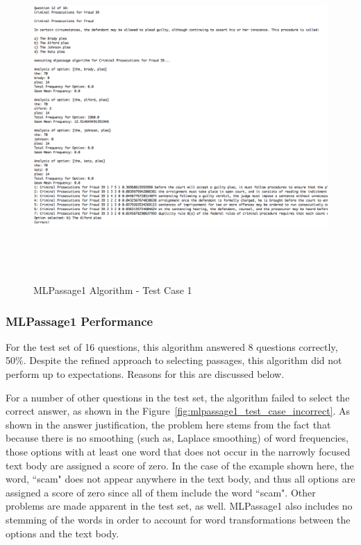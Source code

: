 \begin{figure}
\centering
\vspace{1.0in}
\includegraphics[width=125mm, height=125mm]{mlpassage1_test_case_correct.png}
\caption{MLPassage1 Algorithm - Test Case 1}
\label{fig:mlpassage1_test_case_correct}
\end{figure}

\subsubsection{MLPassage1 Performance}

For the test set of 16 questions, this algorithm answered 8 questions correctly, 50\%.  Despite the refined approach to selecting passages, this algorithm did not perform up to expectations.  Reasons for this are discussed below.


For a number of other questions in the test set, the algorithm failed to select the correct answer, as shown in the Figure~\ref{fig:mlpassage1_test_case_incorrect}.  As shown in the answer justification, the problem here stems from the fact that because there is no smoothing (such as, Laplace smoothing) of word frequencies, those options with at least one word that does not occur in the narrowly focused text body are assigned a score of zero.  In the case of the example shown here, the word, ``scam" does not appear anywhere in the text body, and thus all options are assigned a score of zero since all of them include the word ``scam".  Other problems are made apparent in the test set, as well.  MLPassage1 also includes no stemming of the words in order to account for word transformations between the options and the text body.  


